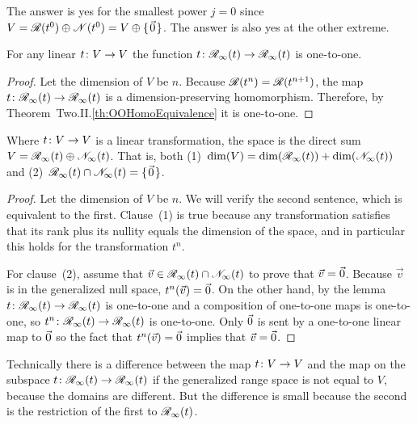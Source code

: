 The answer is yes for the smallest power $j=0$ since
\( V=\mathscr{R}(t^0)\oplus\mathscr{N}(t^0)=V\oplus\mbox{$\{\hspace{0.1em}\vec{0}\hspace{0.1em}\}$} \).
The answer is also yes at the other extreme.

\begin{lemma} \label{lem:RestONeToOne}
For any linear \( \mbox{$t\colon V\to V$} \) 
the function \( \mbox{$t\colon \mathscr{R}_\infty(t)\to \mathscr{R}_\infty(t)$} \)
is one-to-one.
\end{lemma}

\begin{proof}
Let the dimension of $V$ be $n$.
Because \( \mathscr{R}(t^n)=\mathscr{R}(t^{n+1}) \),
the map \( \mbox{$t\colon \mathscr{R}_\infty(t)\to \mathscr{R}_\infty(t)$} \) is
a dimension-preserving homomorphism. 
Therefore, by Theorem~Two.II.\ref{th:OOHomoEquivalence} it is one-to-one.  
\end{proof}

\begin{corollary} \label{GenRngNullDirSumToSp}
Where \( \mbox{$t\colon V\to V$} \) is a linear transformation, 
the space is the direct sum 
\( V=\mathscr{R}_\infty(t)\oplus\mathscr{N}_\infty(t) \).
That is, both (1)~\( \dim(V)=\dim(\mathscr{R}_\infty(t))+\dim(\mathscr{N}_\infty(t)) \) 
and (2)~\( \mathscr{R}_\infty(t)\cap\mathscr{N}_\infty(t)=\mbox{$\{\hspace{0.1em}\vec{0}\hspace{0.1em}\}$} \).
\end{corollary}

\begin{proof}
Let the dimension of $V$ be $n$.
We will verify the second sentence, which is equivalent to the first.
Clause~(1) is true because any transformation satisfies that
its rank plus its nullity
equals the dimension of the space,  
and in particular this holds for the transformation $t^n$.

For clause~(2), assume that
\( \vec{v}\in\mathscr{R}_\infty(t)\cap\mathscr{N}_\infty(t) \)
to prove that $\vec{v}=\vec{0}$.
Because \( \vec{v} \) is in the generalized null space, \( t^n(\vec{v})=\vec{0} \).
On the other hand, by the lemma
\( \mbox{$t\colon \mathscr{R}_\infty(t)\to \mathscr{R}_\infty(t)$} \)
is one-to-one and 
a composition of one-to-one maps is one-to-one, so
\( \mbox{$t^n\colon \mathscr{R}_\infty(t)\to \mathscr{R}_\infty(t)$} \) is one-to-one.
Only \( \vec{0} \) is sent by a one-to-one linear map to
\( \vec{0} \)  so the fact that \( t^n(\vec{v})=\vec{0} \) implies that
\( \vec{v}=\vec{0} \).
\end{proof}

\begin{remark}
Technically there is a difference between the map $\mbox{$t\colon V\to V$}$ and
the map on the subspace \( \mbox{$t\colon \mathscr{R}_\infty(t)\to \mathscr{R}_\infty(t)$} \)
if the generalized range space is not equal to $V$, because the domains are
different.
But the difference is small because
the second is the 
restriction %
of the first to 
$\mathscr{R}_\infty(t)$. 
\end{remark}

